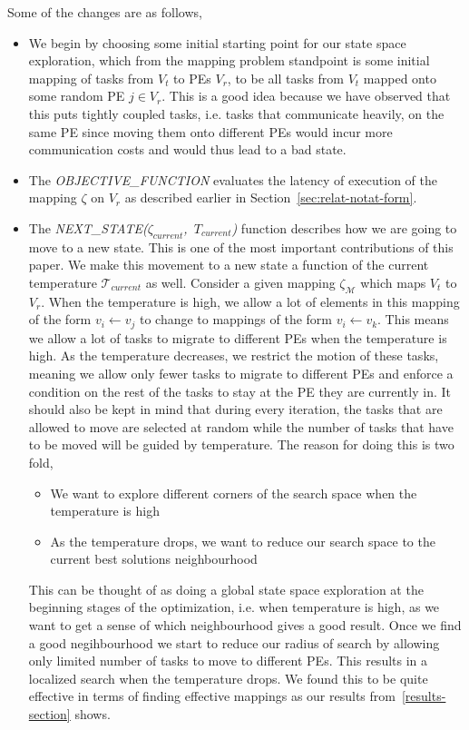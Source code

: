 Some of the changes are as follows,

\begin{itemize}

\item We begin by choosing some initial starting point for our state space exploration, which from
the mapping problem standpoint is some initial mapping of tasks from $V_t$ to
PEs $V_r$, to be all tasks from $V_t$ mapped onto
some random PE $j \in V_r$. This is a good idea because we have observed that
this puts tightly coupled tasks, i.e. tasks that communicate heavily, on the
same PE since moving them onto different PEs would incur more communication
costs and would thus lead to a bad state.

\item The \textit{OBJECTIVE\_FUNCTION} evaluates the latency of execution of
the mapping $\zeta$ on $V_r$ as described earlier in
Section~\ref{sec:relat-notat-form}. 

\item The \mbox{\textit{NEXT\_STATE($\zeta_{current}$, $T_{current}$)}} function
describes how we are going to move to a new state. This is one of the most
important contributions of this paper. We make this movement to a new state a
function of the current temperature $\mathcal{T}_{current}$ as well. Consider a
given mapping $\zeta_\mathcal{M}$ which maps $V_t$ to $V_r$. When the
temperature is high, we allow a lot of elements in this mapping of the form $v_i
\leftarrow v_j$ to change to mappings of the form $v_i \leftarrow v_k$. This
means we allow a lot of tasks to migrate to different PEs when the temperature
is high. As the temperature decreases, we restrict the motion of these tasks,
meaning we allow only fewer tasks to migrate to different PEs and enforce a
condition on the rest of the tasks to stay at the PE they are currently in. It
should also be kept in mind that during every iteration, the tasks that are
allowed to move are selected at random while the number of tasks that have to be
moved will be guided by temperature. The reason for doing this is two fold,
\begin{itemize}
\item We want to explore different corners of the search space when the
temperature is high
\item As the temperature drops, we want to reduce our search space to the
current best solutions neighbourhood
\end{itemize}
This can be thought of as doing a global state space exploration at the beginning
stages of the optimization, i.e. when temperature is high, as we want to get a
sense of which neighbourhood gives a good result. Once we find a good
negihbourhood we start to reduce our radius of search by allowing only limited
number of tasks to move to different PEs. This results in a localized search
when the temperature drops. We found this to be quite effective in terms of
finding effective mappings as our results from~\ref{results-section} shows.


\end{itemize}
